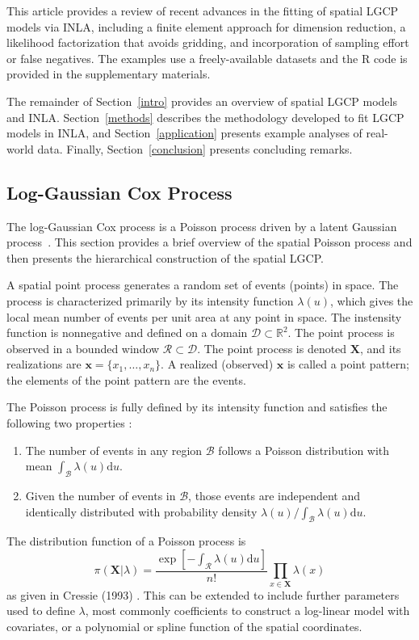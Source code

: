 \documentclass[]{interact}
\begin{document}
This article provides a review of recent advances in the fitting of spatial
LGCP models via INLA, including a finite element approach for dimension
reduction, a likelihood factorization that avoids gridding, and incorporation
of sampling effort or false negatives. The examples use a freely-available
datasets and the R code is provided in the supplementary materials.

The remainder of Section~\ref{intro} provides an overview of spatial LGCP
models and INLA. Section~\ref{methods} describes the methodology developed to
fit LGCP models in INLA, and Section~\ref{application} presents example
analyses of real-world data. Finally, Section~\ref{conclusion} presents
concluding remarks.


\subsection{Log-Gaussian Cox Process}
\label{lgcp}

The log-Gaussian Cox process is a Poisson process driven by a latent Gaussian
process~\cite{moelleretal}. This section provides a brief overview of the
spatial Poisson process and then presents the hierarchical construction of the
spatial LGCP.

A spatial point process generates a random set of events (points) in space.
The process is characterized primarily by its intensity function
\(\lambda(u)\), which gives the local mean number of events per unit area at
any point in space. The instensity function is nonnegative and defined on a
domain \(\mathcal{D} \subset \mathbb{R}^{2}\). The point process is observed
in a bounded window \(\mathcal{R} \subset \mathcal{D}\). The point process is
denoted \(\mathbf{X}\), and its realizations are \(\mathbf{x} = \{x_{1},
\dots, x_{n}\}\). A realized (observed) \(\mathbf{x}\) is called a point
pattern; the elements of the point pattern are the events.

The Poisson process is fully defined by its intensity function and satisfies
the following two properties \cite{moellerwaagepetersen}:
\begin{enumerate}
\item The number of events in any region \(\mathcal{B}\) follows a Poisson
distribution with mean
\(\int_{\mathcal{B}} \lambda(u)\mathrm{d}u\).
\item Given the number of events in \(\mathcal{B}\), those events are
independent and identically distributed with probability density
\(\lambda(u) / \int_{\mathcal{B}} \lambda(u)\mathrm{d}u\).
\end{enumerate}
The distribution function of a Poisson process is
\begin{displaymath}
\pi(\mathbf{X}|\lambda)
= \frac{\exp\left[-\int_{\mathcal{R}} \lambda(u) \mathrm{d}u\right]}
{n!} \prod_{x \in \mathbf{X}} \lambda(x)
\end{displaymath}
as given in Cressie (1993) \cite{cressie}. This can be extended to include
further parameters used to define \(\lambda\), most commonly coefficients
to construct a log-linear model with covariates, or a polynomial or spline
function of the spatial coordinates.
\end{document}
